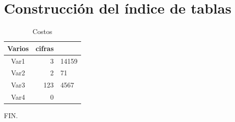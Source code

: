 \documentclass[]{article}
\begin{document}
	
\section{Construcción del índice de tablas}	
\lipsum[12-14]
\begin{table}[h]
	\centering
	\begin{center}
		\begin{tabular}[]{cr@{.}l}
			Varios &  cifras & \\
			\hline 
			Var1 & 3&14159 \\
			Var2 & 2&71 \\
			Var3 & 123&4567 \\
			Var4 & 0 &\\
			\hline	
			
		\end{tabular}
	\end{center}	
\caption{Costos}
\label{table:1}

\end{table}
	

	FIN.
	
\newpage	
	\listoftables
	\listoffigures
	\tableofcontents
	
\end{document}
